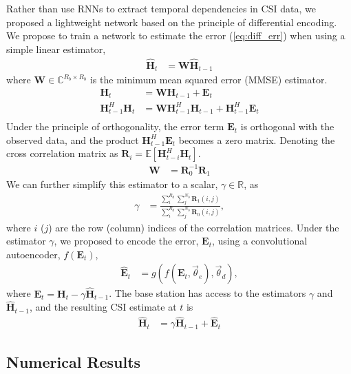 Rather than use RNNs to extract temporal dependencies in CSI data, we proposed a lightweight network based on the principle of differential encoding. We propose to train a network to estimate the error (\ref{eq:diff_err}) when using a simple linear estimator, 
\begin{align*}
\hat{\mathbf H}_t &= \mathbf W \hat{\mathbf H}_{t-1} 
\end{align*}
where $\mathbf W \in \mathbb C^{R_b \times R_b}$ is the minimum mean squared error (MMSE) estimator.
\begin{align*}
\mathbf H_t &= \mathbf W\mathbf H_{t-1} + \mathbf E_t \\
\mathbf H_{t-1}^H\mathbf H_t &= \mathbf W\mathbf H_{t-1}^H\mathbf H_{t-1} + \mathbf H_{t-1}^H\mathbf E_t \\
\end{align*}
Under the principle of orthogonality, the error term $\mathbf E_t$ is orthogonal with the observed data, and the product $\mathbf H^H_{t-1}\mathbf E_t$ becomes a zero matrix. Denoting the cross correlation matrix as $\mathbf R_{i} = \mathbb{E}\left[\mathbf H_{t-i}^H\mathbf H_{t}\right]$.
\begin{align*}
\mathbf W &= \mathbf R_0^{-1} \mathbf R_1 
\end{align*}
We can further simplify this estimator to a scalar, $\gamma \in \mathbb R$, as
\begin{align*}
\gamma &= \frac{\sum_i^{R_d}\sum_j^{N_b}\mathbf R_1(i,j)}{\sum_i^{R_d}\sum_j^{N_b}\mathbf R_0(i,j)},
\end{align*}
where $i$ ($j$) are the row (column) indices of the correlation matrices. Under the estimator $\gamma$, we proposed to encode the error, $\mathbf E_t$, using a convolutional autoencoder, $f(\mathbf E_t)$,
\begin{align*}
\hat{\mathbf E}_t &= g(f(\mathbf E_t, \vec\theta_e), \vec\theta_d),
\end{align*}
where $\mathbf E_t = \mathbf H_t - \gamma\hat{\mathbf H}_{t-1}$. The base station has access to the estimators $\gamma$ and $\hat{\mathbf H}_{t-1}$, and the resulting CSI estimate at $t$ is
\begin{align*}
\hat{\mathbf H}_t &= \gamma \hat{\mathbf H}_{t-1} + \hat{\mathbf{E}}_t
\end{align*}

\subsection{Numerical Results}

